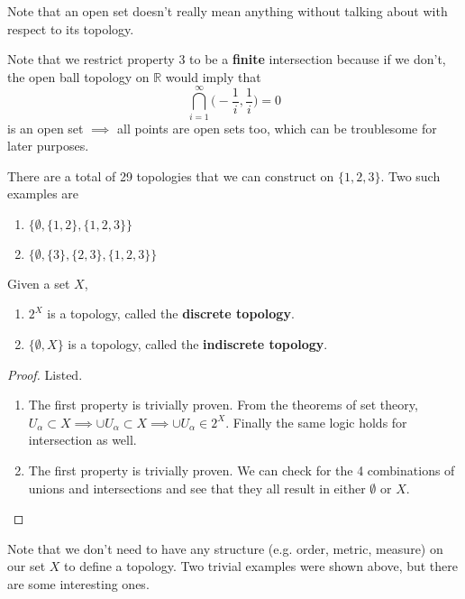     Note that an open set doesn't really mean anything without talking about with respect to its topology. 

    Note that we restrict property 3 to be a \textbf{finite} intersection because if we don't, the open ball topology on $\mathbb{R}$ would imply that 
    \begin{equation}
      \bigcap_{i = 1}^{\infty} \Big( - \frac{1}{i}, \frac{1}{i} \Big) = 0
    \end{equation}
    is an open set $\implies$ all points are open sets too, which can be troublesome for later purposes. 

    \begin{example}
      There are a total of 29 topologies that we can construct on $\{1, 2, 3\}$. Two such examples are 
      \begin{enumerate}
        \item $\{\emptyset, \{1, 2\}, \{1, 2, 3\}\}$ 
        \item $\{\emptyset, \{3\}, \{2, 3\}, \{1, 2, 3\}\}$
      \end{enumerate}
    \end{example} 

    \begin{theorem}
      Given a set $X$, 
      \begin{enumerate}
        \item $2^X$ is a topology, called the \textbf{discrete topology}. 
        \item $\{\emptyset, X \}$ is a topology, called the \textbf{indiscrete topology}. 
      \end{enumerate}
    \end{theorem}
    \begin{proof}
      Listed. 
      \begin{enumerate}
        \item The first property is trivially proven. From the theorems of set theory, $U_\alpha \subset X \implies \cup U_\alpha \subset X \implies \cup U_\alpha \in 2^X$. Finally the same logic holds for intersection as well. 
        \item The first property is trivially proven. We can check for the 4 combinations of unions and intersections and see that they all result in either $\emptyset$ or $X$. 
      \end{enumerate}
    \end{proof}

    Note that we don't need to have any structure (e.g. order, metric, measure) on our set $X$ to define a topology. Two trivial examples were shown above, but there are some interesting ones. 

